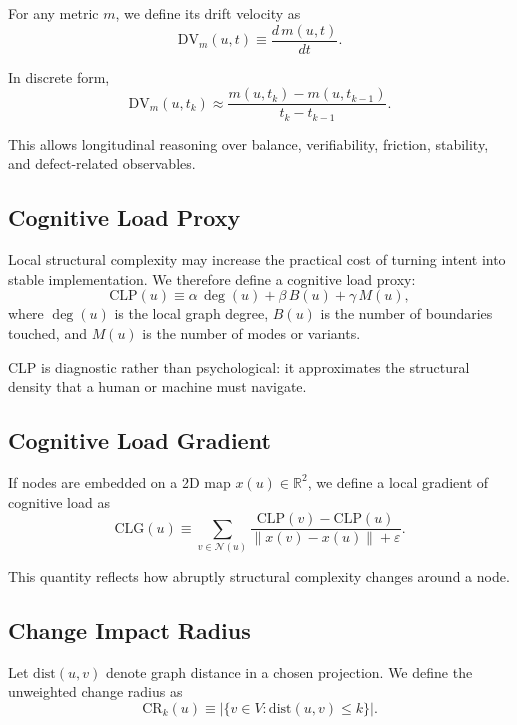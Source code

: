 \documentclass[twocolumn]{aastex701}
\begin{document}
For any metric $m$, we define its drift velocity as
\begin{equation}
\mathrm{DV}_m(u,t) \equiv \frac{d\,m(u,t)}{dt}.
\end{equation}

In discrete form,
\begin{equation}
\mathrm{DV}_m(u,t_k) \approx
\frac{m(u,t_k)-m(u,t_{k-1})}
{t_k-t_{k-1}}.
\end{equation}

This allows longitudinal reasoning over balance, verifiability,
friction, stability, and defect-related observables.

\subsection{Cognitive Load Proxy}

Local structural complexity may increase the practical cost of turning intent
into stable implementation.
We therefore define a cognitive load proxy:
\begin{equation}
\mathrm{CLP}(u) \equiv
\alpha\,\deg(u) + \beta\,B(u) + \gamma\,M(u),
\end{equation}
where $\deg(u)$ is the local graph degree,
$B(u)$ is the number of boundaries touched,
and $M(u)$ is the number of modes or variants.

CLP is diagnostic rather than psychological:
it approximates the structural density that a human or machine must navigate.

\subsection{Cognitive Load Gradient}

If nodes are embedded on a 2D map $x(u)\in\mathbb{R}^2$,
we define a local gradient of cognitive load as
\begin{equation}
\mathrm{CLG}(u) \equiv
\sum_{v\in\mathcal{N}(u)}
\frac{\mathrm{CLP}(v)-\mathrm{CLP}(u)}
{\|x(v)-x(u)\|+\varepsilon}.
\end{equation}

This quantity reflects how abruptly structural complexity changes
around a node.

\subsection{Change Impact Radius}

Let $\mathrm{dist}(u,v)$ denote graph distance in a chosen projection.
We define the unweighted change radius as
\begin{equation}
\mathrm{CR}_k(u) \equiv
\left| \{v \in V : \mathrm{dist}(u,v)\le k\} \right|.
\end{equation}
\end{document}
